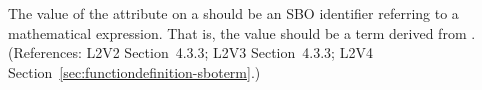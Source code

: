 The value of the  attribute on a \FunctionDefinition should be an
SBO identifier referring to a mathematical expression.  That is, the value
should be a term derived from \sbomathformula.  (References: L2V2 Section~4.3.3;
L2V3 Section~4.3.3; L2V4 Section~\ref{sec:functiondefinition-sboterm}.)

